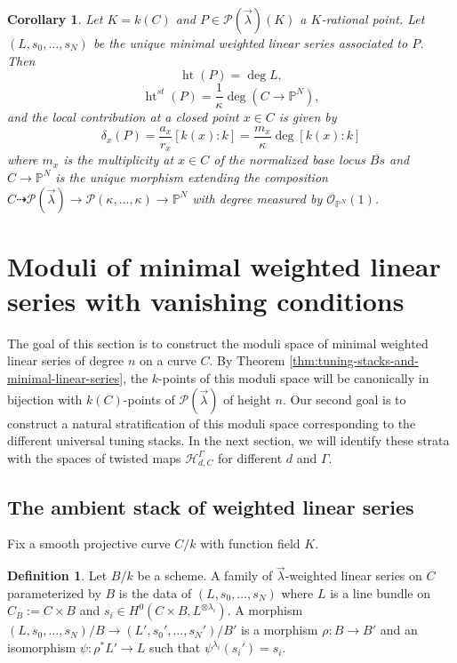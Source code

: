 \documentclass[a4paper,12pt]{amsart}
\newtheorem{cor}[thm]{Corollary}
\theoremstyle{definition}
\newtheorem{defn}[thm]{Definition}
\newcommand{\bP}{\mathbb{P}}
\newcommand{\cO}{\mathcal{O}}
\newcommand{\cH}{\mathcal{H}}
\DeclareMathOperator{\height}{ht}
\newcommand{\Pcv}{\mathcal{P}(\vec{\lambda})}
\newcommand{\Pc}{\mathcal{P}}
\newcommand{\lambdavec}{{\vec{\lambda}}}
\begin{document}
	\begin{cor} \label{cor:height:normalized} Let $K = k(C)$ and $P \in \Pcv(K)$ a $K$-rational point. Let $(L, s_0, \ldots, s_N)$ be the unique minimal weighted linear series associated to $P$. Then 
		$$
		\height(P) = \deg L,
		$$
		$$
		\height^{st}(P) = \frac{1}{\kappa}\deg(C \to \bP^N),
		$$
		and the local contribution at a closed point $x \in C$ is given by
		$$
		\delta_x(P) = \frac{a_x}{r_x} [k(x):k] = \frac{m_x}{\kappa}\deg [k(x):k]
		$$
		where $m_x$ is the multiplicity at $x \in C$ of the normalized base locus $\overline{Bs}$ and $C \to \bP^N$ is the unique morphism extending the composition $C \dashrightarrow \Pcv \to \Pc(\kappa, \ldots, \kappa) \to \bP^N$ with degree measured by $\cO_{\bP^N}(1)$. 
	\end{cor}
	
	
	\section{Moduli of minimal weighted linear series with vanishing conditions} 
	\label{sec:mod-sp-ratpts}
	
	The goal of this section is to construct the moduli space of minimal weighted linear series of degree $n$ on a curve $C$. By Theorem \ref{thm:tuning-stacks-and-minimal-linear-series}, the $k$-points of this moduli space will be canonically in bijection with $k(C)$-points of $\Pcv$ of height $n$. Our second goal is to construct a natural stratification of this moduli space corresponding to the different universal tuning stacks. In the next section, we will identify these strata with the spaces of twisted maps $\cH^{\Gamma}_{d,C}$ for different $d$ and $\Gamma$. 
	
	\subsection{The ambient stack of weighted linear series} 
	
	Fix a smooth projective curve $C/k$ with function field $K$.  
	
	\begin{defn}
		Let $B/k$ be a scheme. A family of $\lambdavec$-weighted linear series on $C$ parameterized by $B$ is the data of $(L, s_0, \ldots, s_N)$ where $L$ is a line bundle on $C_B := C \times B$ and $s_i \in H^0(C \times B, L^{\otimes \lambda_i})$. A morphism $(L, s_0, \ldots, s_N)/B \to (L', s_0', \ldots, s_N')/B'$ is a morphism $\rho : B \to B'$ and an isomorphism $\psi : \rho^*L' \to L$ such that $\psi^{\lambda_i}(s_i') = s_i$. 
	\end{defn}
	
\end{document}
